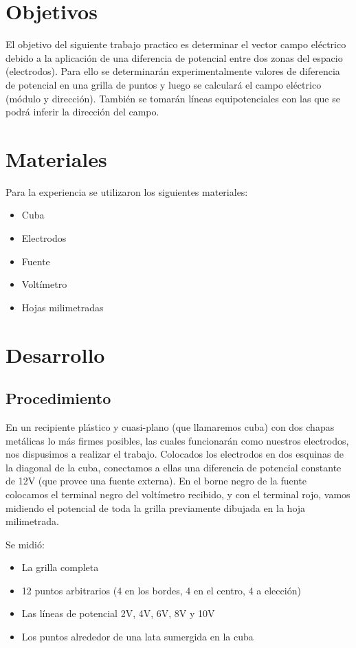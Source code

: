 \documentclass{article}
\begin{document}
\section{Objetivos}
	El objetivo del siguiente trabajo practico es determinar el vector campo eléctrico debido a la
aplicación de una diferencia de potencial entre dos zonas del espacio (electrodos). Para ello se
determinarán experimentalmente valores de diferencia de potencial en una grilla de puntos y
luego se calculará el campo eléctrico (módulo y dirección). También se tomarán líneas
equipotenciales con las que se podrá inferir la dirección del campo.

\section{Materiales}
	Para la experiencia se utilizaron los siguientes materiales:
    \begin{itemize}
		\item Cuba
        \item Electrodos
        \item Fuente
        \item Voltímetro
        \item Hojas milimetradas
	\end{itemize}

\section{Desarrollo}
\subsection{Procedimiento}
 En un recipiente plástico y cuasi-plano (que llamaremos cuba) con dos chapas metálicas lo más firmes posibles, las cuales funcionarán como nuestros electrodos, nos dispusimos a realizar el trabajo. Colocados los electrodos en dos esquinas de la diagonal de la cuba, conectamos a ellas una diferencia de potencial constante de 12V (que provee una fuente externa). En el borne negro de la fuente colocamos el terminal negro del voltímetro recibido, y con el terminal rojo, vamos midiendo el potencial de toda la grilla previamente dibujada en la hoja milimetrada.

Se midió:
    \begin{itemize}
		\item La grilla completa
        \item 12 puntos arbitrarios (4 en los bordes, 4 en el centro, 4 a elección)
        \item Las líneas de potencial 2V, 4V, 6V, 8V y 10V
        \item Los puntos alrededor de una lata sumergida en la cuba
	\end{itemize}
\end{document}
